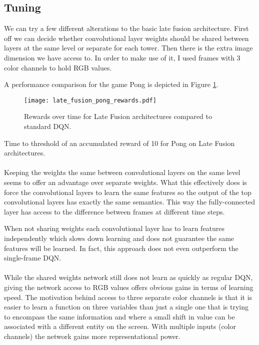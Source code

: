 \subsection{Tuning}
\label{sub:late_fusion_tuning}
We can try a few different alterations to the basic late fusion architecture.
First off we can decide whether convolutional layer weights should be shared
between layers at the same level
or separate for each tower.
Then there is the extra image dimension we have access to.
In order to make use of it,
I used frames with 3 color channels
to hold RGB values.

A performance comparison for the game Pong is depicted in
Figure \ref{fig:late_fusion_pong_rewards}.

\begin{figure}[htpb]
  \centering
  \texttt{[image: late\_fusion\_pong\_rewards.pdf]}
  \caption{Rewards over time for Late Fusion architectures
  compared to standard DQN.}
  \label{fig:late_fusion_pong_rewards}
\end{figure}

\begin{table}[htpb]
  \center
  \renewcommand{\arraystretch}{1.3}
  
  \caption{
    Time to threshold
    of an accumulated reward of 10
    for Pong
    on Late Fusion architectures.
  }
\end{table}

\paragraph{}
Keeping the weights the same between convolutional layers on the same level
seems to offer an advantage over separate weights.
What this effectively does
is force the convolutional layers to learn the same features
so the output of the top convolutional layers
has exactly the same semantics.
This way the fully-connected layer has access
to the difference between frames at different time steps.

When not sharing weights each convolutional layer
has to learn features independently which slows down learning
and does not guarantee the same features will be learned.
In fact, this approach does not even outperform
the single-frame DQN.

\paragraph{}
While  the shared weights network
still does not learn as quickly as regular DQN,
giving the network access to RGB values offers obvious gains
in terms of learning speed.
The motivation behind access to three separate color channels
is that it is easier to learn a function on three variables
than just a single one
that is trying to encompass the same information
and where a small shift in value can be associated
with a different entity on the screen.
With multiple inputs (color channels)
the network gains more representational power.

